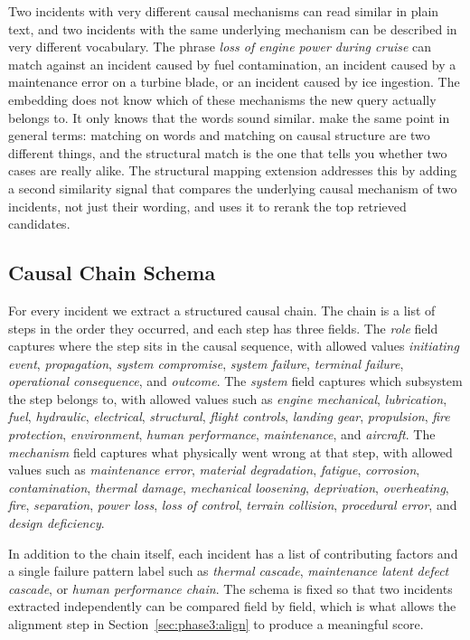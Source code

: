 \documentclass[11pt]{article}
\begin{document}
Two incidents with very different causal mechanisms can read similar in plain text, and two incidents with the same underlying mechanism can be described in very different vocabulary. The phrase \emph{loss of engine power during cruise} can match against an incident caused by fuel contamination, an incident caused by a maintenance error on a turbine blade, or an incident caused by ice ingestion. The embedding does not know which of these mechanisms the new query actually belongs to. It only knows that the words sound similar. \citet{GentnerMarkman1997} make the same point in general terms: matching on words and matching on causal structure are two different things, and the structural match is the one that tells you whether two cases are really alike. The structural mapping extension addresses this by adding a second similarity signal that compares the underlying causal mechanism of two incidents, not just their wording, and uses it to rerank the top retrieved candidates.

\subsection{Causal Chain Schema}
\label{sec:phase3:schema}

For every incident we extract a structured causal chain. The chain is a list of steps in the order they occurred, and each step has three fields. The \emph{role} field captures where the step sits in the causal sequence, with allowed values \emph{initiating event}, \emph{propagation}, \emph{system compromise}, \emph{system failure}, \emph{terminal failure}, \emph{operational consequence}, and \emph{outcome}. The \emph{system} field captures which subsystem the step belongs to, with allowed values such as \emph{engine mechanical}, \emph{lubrication}, \emph{fuel}, \emph{hydraulic}, \emph{electrical}, \emph{structural}, \emph{flight controls}, \emph{landing gear}, \emph{propulsion}, \emph{fire protection}, \emph{environment}, \emph{human performance}, \emph{maintenance}, and \emph{aircraft}. The \emph{mechanism} field captures what physically went wrong at that step, with allowed values such as \emph{maintenance error}, \emph{material degradation}, \emph{fatigue}, \emph{corrosion}, \emph{contamination}, \emph{thermal damage}, \emph{mechanical loosening}, \emph{deprivation}, \emph{overheating}, \emph{fire}, \emph{separation}, \emph{power loss}, \emph{loss of control}, \emph{terrain collision}, \emph{procedural error}, and \emph{design deficiency}.

In addition to the chain itself, each incident has a list of contributing factors and a single failure pattern label such as \emph{thermal cascade}, \emph{maintenance latent defect cascade}, or \emph{human performance chain}. The schema is fixed so that two incidents extracted independently can be compared field by field, which is what allows the alignment step in Section~\ref{sec:phase3:align} to produce a meaningful score.
\end{document}

